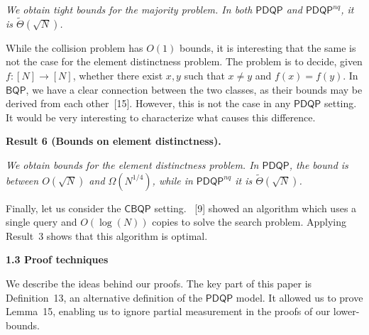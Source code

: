\emph{We obtain tight bounds for the majority problem. In both $\mathsf{PDQP}$ and $\mathsf{PDQP}^{nq}$, it is $\tilde{\Theta}(\sqrt{N})$.}\par






While the collision problem has $O(1)$ bounds, it is interesting that the same is not the case for the element distinctness problem. The problem is to decide, given $f:[N]\rightarrow[N]$, whether there exist $x,y$ such that $x\neq y$ and $f(x)=f(y)$. In $\mathsf{BQP}$, we have a clear connection between the two classes, as their bounds may be derived from each other [15]. However, this is not the case in any $\mathsf{PDQP}$ setting. It would be very interesting to characterize what causes this difference.\par





\par\medskip\noindent\textbf{
\textbf{Result 6}\textbf{ }(\textbf{Bounds on element distinctness})\textbf{.}
}\par



\emph{We obtain bounds for the element distinctness problem. In $\mathsf{PDQP}$, the bound is between $O(\sqrt{N})$ and $\Omega(N^{1/4})$, while in $\mathsf{PDQP}^{nq}$ it is $\tilde{\Theta}(\sqrt{N})$.}\par






Finally, let us consider the $\mathsf{CBQP}$ setting.  [9] showed an algorithm which uses a single query and $O(\log(N))$ copies to solve the search problem. Applying Result 3 shows that this algorithm is optimal.\par






\par\medskip\noindent\textbf{
1.3 Proof techniques}\par




We describe the ideas behind our proofs. The key part of this paper is Definition 13, an alternative definition of the $\mathsf{PDQP}$ model. It allowed us to prove Lemma 15, enabling us to ignore partial measurement in the proofs of our lower-bounds.\par



